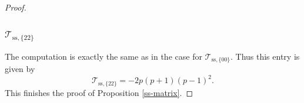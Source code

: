 \documentclass[10pt]{amsart}
\numberwithin{equation}{section}
\theoremstyle{definition}
\newtheorem{construction}[equation]{Construction}
\def\calO{\mathcal{O}}
\def\calT{\mathcal{T}}
\def\fracm{\mathfrak{m}}
\def\rmB{\mathrm{B}}
\def\rmZ{\mathrm{Z}}
\begin{document}
\begin{proof}
\subsubsection{$\calT_{\mathrm{ss},\{22\}}$} The computation is exactly the same as in the case for $\calT_{\mathrm{ss},\{00\}}$. Thus this entry is given by 
\begin{equation*}
\calT_{\mathrm{ss},\{22\}}=-2p(p+1)(p-1)^{2}. 
\end{equation*}
This finishes the proof of Proposition \ref{ss-matrix}.
\end{proof}

\end{document}
